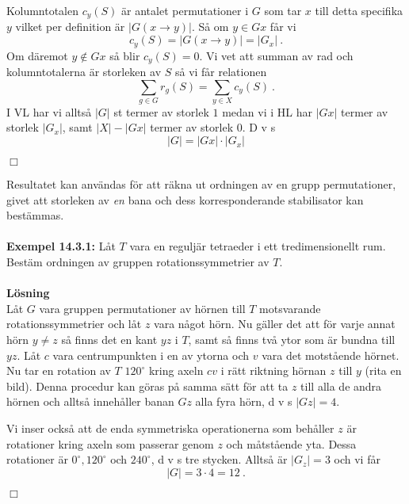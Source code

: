 \documentclass{article}
\begin{document}
Kolumntotalen $c_y(S)$ är antalet permutationer i $G$ som tar $x$ till detta specifika $y$ vilket per definition är $|G(x\rightarrow y)|$. Så om $y\in Gx$ får vi
$$
c_y(S)=|G(x\rightarrow y)|=|G_x| \ .
$$
Om däremot $y\notin Gx$ så blir $c_y(S)=0$. Vi vet att summan av rad och kolumntotalerna är storleken av $S$ så vi får relationen
$$
\sum_{g\in G}r_g(S)=\sum_{y\in X}c_y(S) \ .
$$
I VL har vi alltså $|G|$ st termer av storlek $1$ medan vi i HL har $|Gx|$ termer av storlek $|G_x|$, samt $|X|-|Gx|$ termer av storlek $0$. D v s
$$
|G|=|Gx|\cdot|G_x|
$$
\begin{flushright}
$\Box$
\end{flushright}
Resultatet kan användas för att räkna ut ordningen av en grupp permutationer, givet att storleken av \textit{en} bana och dess korresponderande stabilisator kan bestämmas.
\\ \\
\textbf{Exempel 14.3.1:} Låt $T$ vara en reguljär tetraeder i ett tredimensionellt rum. Bestäm ordningen av gruppen rotationssymmetrier av $T$.
\\ \\
\textbf{Lösning}
\\
Låt $G$ vara gruppen permutationer av hörnen till $T$ motsvarande rotationssymmetrier och låt $z$ vara något hörn. Nu gäller det att för varje annat hörn $y\neq z$ så finns det en kant $yz$ i $T$, samt så finns två ytor som är bundna till $yz$. Låt $c$ vara centrumpunkten i en av ytorna och $v$ vara det motstående hörnet. Nu tar en rotation av $T$ $120^{\circ}$ kring axeln $cv$ i rätt riktning hörnan $z$ till $y$ (rita en bild). Denna procedur kan göras på samma sätt för att ta $z$ till alla de andra hörnen och alltså innehåller banan $Gz$ alla fyra hörn, d v s $|Gz|=4$.

Vi inser också att de enda symmetriska operationerna som behåller $z$ är rotationer kring axeln som passerar genom $z$ och måtstående yta. Dessa rotationer är $0^{\circ},120^{\circ}$ och $240^{\circ}$, d v s tre stycken. Alltså är $|G_z|=3$ och vi får
$$
|G|=3\cdot4=12 \ .
$$
\begin{flushright}
$\Box$
\end{flushright}
\end{document}
